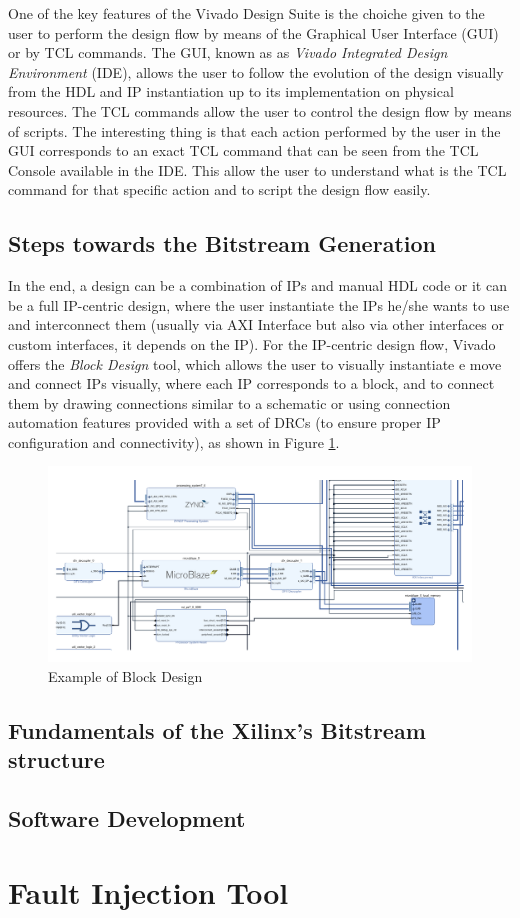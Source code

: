 One of the key features of the Vivado Design Suite is the choiche given to the user to perform the design flow by means of the Graphical User Interface (GUI) or by TCL commands. The GUI, known as as \textit{Vivado Integrated Design Environment} (IDE), allows the user to follow the evolution of the design visually from the HDL and IP instantiation up to its implementation on physical resources. The TCL commands allow the user to control the design flow by means of scripts. The interesting thing is that each action performed by the user in the GUI corresponds to an exact TCL command that can be seen from the TCL Console available in the IDE. This allow the user to understand what is the TCL command for that specific action and to script the design flow easily. 

\subsection{Steps towards the Bitstream Generation}

In the end, a design can be a combination of IPs and manual HDL code or it can be a full IP-centric design, where the user instantiate the IPs he/she wants to use and interconnect them (usually via AXI Interface but also via other interfaces or custom interfaces, it depends on the IP). For the IP-centric design flow, Vivado offers the \textit{Block Design} tool, which allows the user to visually instantiate e move and connect IPs visually, where each IP corresponds to a block, and to connect them by drawing connections similar to a schematic or using connection automation features provided with a set of DRCs (to ensure proper IP configuration and connectivity), as shown in Figure \ref{fig:block_design_example}. \bigskip

\begin{figure}[H]
\centering
\includegraphics[width=0.8\linewidth]{images/chapter3/design_example-cropped.pdf}
\caption{Example of Block Design}
\label{fig:block_design_example}
\end{figure}

\subsection{Fundamentals of the Xilinx's Bitstream structure}
\subsection{Software Development}
\section{Fault Injection Tool}